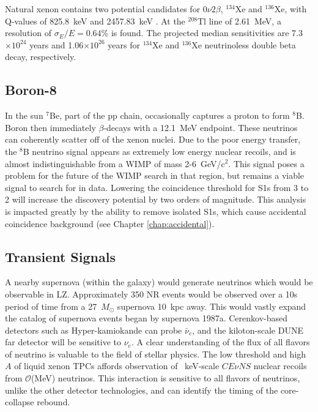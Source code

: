 Natural xenon contains two potential candidates for $0 \nu 2 \beta$, $^{134}$Xe and $^{136}$Xe, with Q-values of 825.8~keV and  2457.83~keV \cite{lux-zeplin_projected_2021}.
At the $^{208}$Tl line of 2.61~MeV, a resolution of $\sigma_E/E =0.64$\% is found.
The projected median sensitivities are 7.3$\times10^{24}$ years and 1.06$\times 10^{26}$ years for $^{134}$Xe and $^{136}$Xe neutrinoless double beta decay, respectively\cite{akerib_projected_2020}.

\subsection{Boron-8}

In the sun $^7$Be, part of the pp chain, occasionally captures a proton to form $^8$B.
Boron then immediately $\beta$-decays with a 12.1~MeV endpoint.
These neutrinos can coherently scatter off of the xenon nuclei.
Due to the poor energy transfer, the $^8$B neutrino signal appears as extremely low energy nuclear recoils, and is almost indistinguishable from a WIMP of mass 2-6~GeV/c$^2$.
This signal poses a problem for the future of the WIMP search in that region, but remains a viable signal to search for in data.
Lowering the coincidence threshold for S1s from 3 to 2 will increase the discovery potential by two orders of magnitude\cite{akerib_enhancing_2021}.
This analysis is impacted greatly by the ability to remove isolated S1s, which cause accidental coincidence background (see Chapter \ref{chap:accidental}).

\subsection{Transient Signals}

A nearby supernova (within the galaxy) would generate neutrinos which would be observable in LZ.
Approximately 350 NR events would be observed over a 10s period of time from a 27~$M_\odot$ supernova 10~kpc away\cite{khaitan_supernova_2018}.
This would vastly expand the catalog of supernova events began by supernova 1987a.
Cerenkov-based detectors such as Hyper-kamiokande can probe $\bar \nu_e$, and the kiloton-scale DUNE far detector will be sensitive to $\nu_e$.
A clear understanding of the flux of all flavors of neutrino is valuable to the field of stellar physics.
The low threshold and high $A$ of liquid xenon TPCs affords observation of ~keV-scale $CE\nu NS$ nuclear recoils from $\mathcal{O}$(MeV) neutrinos.
This interaction is sensitive to all flavors of neutrinos\cite{lang_supernova_2016}, unlike the other detector technologies, and can identify the timing of the core-collapse rebound.

